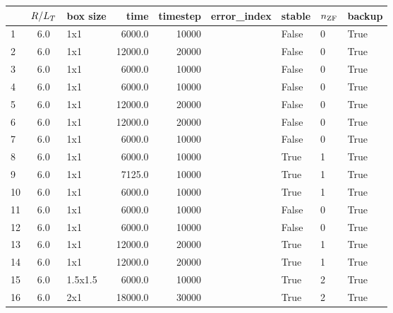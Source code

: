 \begin{center}
    \captionsetup{type=table}
    \begin{tabular}{l | c | l | r r l | l l | l }
            & $R/L_T$ & box size & time    & timestep    & error\_index & stable   & $n_\mathrm{ZF}$ & backup \\ \hline 
        1   & 6.0    & 1x1      &  6000.0 & 10000       & ~            & False    & 0      & True   \\ 
        2   & 6.0    & 1x1      & 12000.0 & 20000       & ~            & False    & 0      & True   \\ 
        3   & 6.0    & 1x1      &  6000.0 & 10000       & ~            & False    & 0      & True   \\ 
        4   & 6.0    & 1x1      &  6000.0 & 10000       & ~            & False    & 0      & True   \\ 
        5   & 6.0    & 1x1      & 12000.0 & 20000       & ~            & False    & 0      & True   \\ 
        6   & 6.0    & 1x1      & 12000.0 & 20000       & ~            & False    & 0      & True   \\ 
        7   & 6.0    & 1x1      &  6000.0 & 10000       & ~            & False    & 0      & True   \\ 
        8   & 6.0    & 1x1      &  6000.0 & 10000       & ~            & True     & 1      & True   \\ 
        9   & 6.0    & 1x1      &  7125.0 & 10000       & ~            & True     & 1      & True   \\ 
        10  & 6.0    & 1x1      &  6000.0 & 10000       & ~            & True     & 1      & True   \\ 
        11  & 6.0    & 1x1      &  6000.0 & 10000       & ~            & False    & 0      & True   \\ 
        12  & 6.0    & 1x1      &  6000.0 & 10000       & ~            & False    & 0      & True   \\ 
        13  & 6.0    & 1x1      & 12000.0 & 20000       & ~            & True     & 1      & True   \\ 
        14  & 6.0    & 1x1      & 12000.0 & 20000       & ~            & True     & 1      & True   \\
        15  & 6.0    & 1.5x1.5  &  6000.0 & 10000       & ~            & True     & 2      & True   \\
        16  & 6.0    & 2x1      & 18000.0 & 30000       & ~            & True     & 2      & True   \\ 

\end{tabular}
\end{center}
